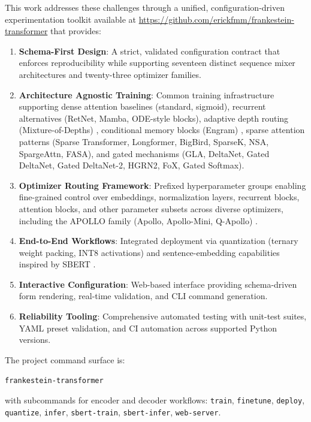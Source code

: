 \documentclass[11pt,a4paper]{article}
\begin{document}
This work addresses these challenges through a unified, configuration-driven experimentation toolkit available at \url{https://github.com/erickfmm/frankestein-transformer} that provides:
\begin{enumerate}[leftmargin=*]
    \item \textbf{Schema-First Design}: A strict, validated configuration contract that enforces reproducibility while supporting seventeen distinct sequence mixer architectures and twenty-three optimizer families.
    \item \textbf{Architecture Agnostic Training}: Common training infrastructure supporting dense attention baselines (standard, sigmoid), recurrent alternatives (RetNet, Mamba, ODE-style blocks), adaptive depth routing (Mixture-of-Depths) \citep{zhu2026mixtureofdepthsattention}, conditional memory blocks (Engram) \citep{cheng2026conditionalmemoryscalablelookup}, sparse attention patterns (Sparse Transformer, Longformer, BigBird, SparseK, NSA, SpargeAttn, FASA), and gated mechanisms (GLA, DeltaNet, Gated DeltaNet, Gated DeltaNet-2, HGRN2, FoX, Gated Softmax).
    \item \textbf{Optimizer Routing Framework}: Prefixed hyperparameter groups enabling fine-grained control over embeddings, normalization layers, recurrent blocks, attention blocks, and other parameter subsets across diverse optimizers, including the APOLLO family (Apollo, Apollo-Mini, Q-Apollo) \citep{zhu2025apollosgdlikememoryadamwlevel}.
    \item \textbf{End-to-End Workflows}: Integrated deployment via quantization (ternary weight packing, INT8 activations) and sentence-embedding capabilities inspired by SBERT \citep{reimers_sentence-bert_2019}.
    \item \textbf{Interactive Configuration}: Web-based interface providing schema-driven form rendering, real-time validation, and CLI command generation.
    \item \textbf{Reliability Tooling}: Comprehensive automated testing with unit-test suites, YAML preset validation, and CI automation across supported Python versions.
\end{enumerate}

The project command surface is:
\begin{center}
\texttt{frankestein-transformer}
\end{center}
with subcommands for encoder and decoder workflows:
\texttt{train}, \texttt{finetune}, \texttt{deploy}, \texttt{quantize}, \texttt{infer}, \texttt{sbert-train}, \texttt{sbert-infer}, \texttt{web-server}.
\end{document}
